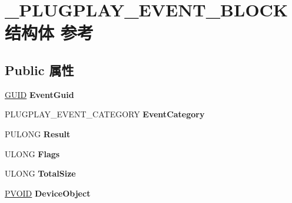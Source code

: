 \hypertarget{struct___p_l_u_g_p_l_a_y___e_v_e_n_t___b_l_o_c_k}{}\section{\+\_\+\+P\+L\+U\+G\+P\+L\+A\+Y\+\_\+\+E\+V\+E\+N\+T\+\_\+\+B\+L\+O\+C\+K结构体 参考}
\label{struct___p_l_u_g_p_l_a_y___e_v_e_n_t___b_l_o_c_k}
\subsection*{Public 属性}
\begin{DoxyCompactItemize}
\item 
\mbox{\label{struct___p_l_u_g_p_l_a_y___e_v_e_n_t___b_l_o_c_k_a4843e2d50e32763949e3c2e13c7216ae}} 
\hyperlink{interface_g_u_i_d}{G\+U\+ID} {\bfseries Event\+Guid}
\item 
\mbox{\label{struct___p_l_u_g_p_l_a_y___e_v_e_n_t___b_l_o_c_k_a9311b94286012bb916378bc8df665034}} 
P\+L\+U\+G\+P\+L\+A\+Y\+\_\+\+E\+V\+E\+N\+T\+\_\+\+C\+A\+T\+E\+G\+O\+RY {\bfseries Event\+Category}
\item 
\mbox{\label{struct___p_l_u_g_p_l_a_y___e_v_e_n_t___b_l_o_c_k_a74e7c8ef95ff5a4aeb25bdbf85d830b5}} 
P\+U\+L\+O\+NG {\bfseries Result}
\item 
\mbox{\label{struct___p_l_u_g_p_l_a_y___e_v_e_n_t___b_l_o_c_k_ac56c5448ebc6db4c2a951f42a0d66add}} 
U\+L\+O\+NG {\bfseries Flags}
\item 
\mbox{\label{struct___p_l_u_g_p_l_a_y___e_v_e_n_t___b_l_o_c_k_a9e5aeb0b4842ac7ab318d0579c0e528d}} 
U\+L\+O\+NG {\bfseries Total\+Size}
\item 
\mbox{\label{struct___p_l_u_g_p_l_a_y___e_v_e_n_t___b_l_o_c_k_af7b146feb83acde10f454c4364016a9f}} 
\hyperlink{interfacevoid}{P\+V\+O\+ID} {\bfseries Device\+Object}
\item 

\end{DoxyCompactItemize}
